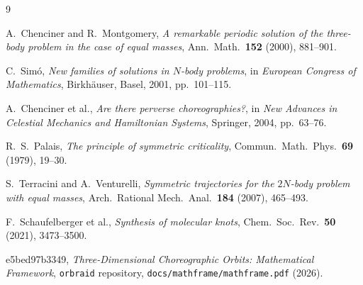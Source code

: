 \documentclass[12pt, a4paper]{article}
\theoremstyle{definition}
\begin{document}
\begin{thebibliography}{9}

A.~Chenciner and R.~Montgomery,
\textit{A remarkable periodic solution of the three-body problem in the case of equal masses},
Ann.\ Math.\ \textbf{152} (2000), 881--901.

C.~Sim\'o,
\textit{New families of solutions in $N$-body problems},
in \textit{European Congress of Mathematics}, Birkh\"auser, Basel, 2001, pp.\ 101--115.

A.~Chenciner et al.,
\textit{Are there perverse choreographies?},
in \textit{New Advances in Celestial Mechanics and Hamiltonian Systems},
Springer, 2004, pp.\ 63--76.

R.~S.~Palais,
\textit{The principle of symmetric criticality},
Commun.\ Math.\ Phys.\ \textbf{69} (1979), 19--30.

S.~Terracini and A.~Venturelli,
\textit{Symmetric trajectories for the $2N$-body problem with equal masses},
Arch.\ Rational Mech.\ Anal.\ \textbf{184} (2007), 465--493.

F.~Schaufelberger et al.,
\textit{Synthesis of molecular knots},
Chem.\ Soc.\ Rev.\ \textbf{50} (2021), 3473--3500.

e5bed97b3349,
\textit{Three-Dimensional Choreographic Orbits: Mathematical Framework},
\texttt{orbraid} repository, \texttt{docs/mathframe/mathframe.pdf} (2026).

\end{thebibliography}
\end{document}
